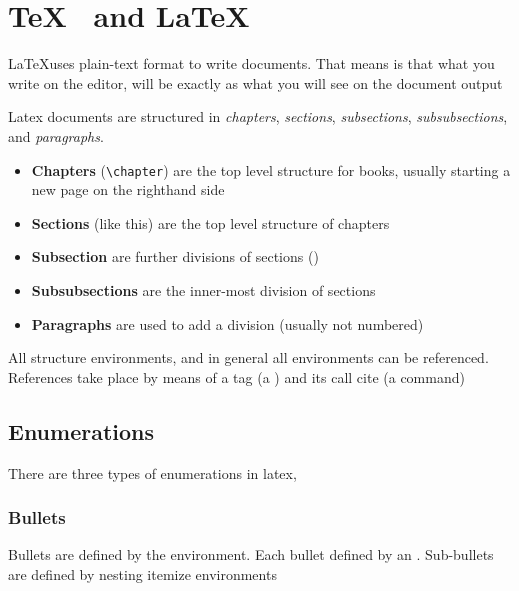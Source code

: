 

\section{\TeX~ and \LaTeX}

\LaTeX uses plain-text format to write documents. That means is that what you write on the editor, will be exactly as what you will see on the document output

Latex documents are structured in \emph{chapters}, \emph{sections}, \emph{subsections}, \emph{subsubsections}, and \emph{paragraphs}.

\begin{itemize}
\item \textbf{Chapters} (\verb|\chapter|) are the top level structure for books, usually starting a new page on the righthand side
\item \textbf{Sections} (like this) are the top level structure of chapters
\item \textbf{Subsection} are further divisions of sections (\cf {})
\item \textbf{Subsubsections} are the inner-most division of sections
\item \textbf{Paragraphs} are used to add a division (usually not numbered)
\end{itemize}

All structure environments, and in general all environments can be referenced. References take place by means of a tag (\ie a ) and its call cite (\ie a  command)

\subsection{Enumerations}
\label{sec:enums}

There are three types of enumerations in latex, 

\subsubsection{Bullets}

Bullets are defined by the  environment. Each bullet defined by an . Sub-bullets are defined by nesting itemize environments

